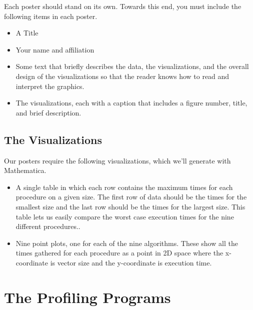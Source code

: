 \documentclass[]{tufte-handout}
\begin{document}
Each poster should stand on its own. Towards this end, you must include the following items in each poster. 
\begin{itemize}
\item A Title
\item Your name and affiliation
\item Some text that briefly describes the data, the visualizations, and the overall design of the visualizations so that the reader knows how to read and interpret the graphics.
\item The visualizations, each with a caption that includes a figure number, title, and brief description. 
\end{itemize}

\subsection{The Visualizations}

Our posters require the following visualizations, which we'll generate with Mathematica. 
\begin{itemize}
\item A single table in which each row contains the maximum times for each procedure on a given size. The first row of data should be the times for the smallest size and the last row should be the times for the largest size. This table lets us easily compare the worst case execution times for the nine different procedures..
\item Nine point plots, one for each of the nine algorithms. These show all the times gathered for each procedure as a point in 2D space where the x-coordinate is vector size and the y-coordinate is execution time.    
\end{itemize}


\section{The Profiling Programs}
\end{document}
